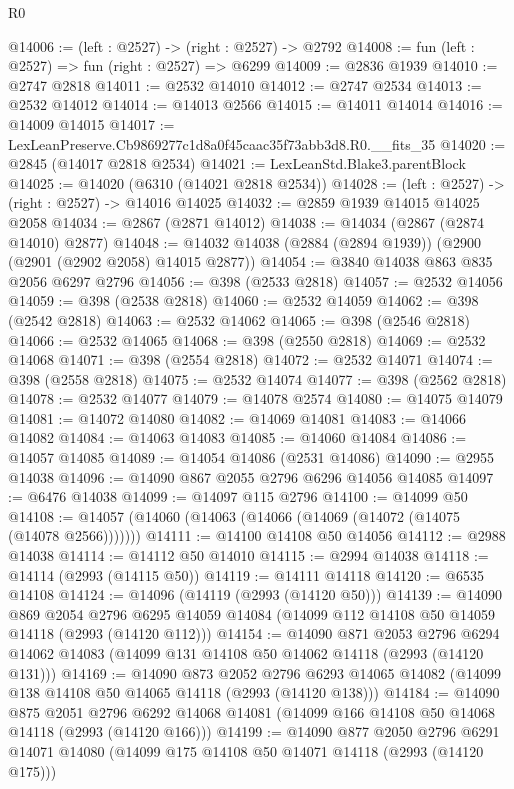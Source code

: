 \begin{lexlean}{R0}
\begin{coremodule}
@14006 := (left : @2527) -> (right : @2527) -> @2792
@14008 := fun (left : @2527) => fun (right : @2527) => @6299
@14009 := @2836 @1939
@14010 := @2747 @2818
@14011 := @2532 @14010
@14012 := @2747 @2534
@14013 := @2532 @14012
@14014 := @14013 @2566
@14015 := @14011 @14014
@14016 := @14009 @14015
@14017 := LexLeanPreserve.Cb9869277c1d8a0f45caac35f73abb3d8.R0.__fits_35
@14020 := @2845 (@14017 @2818 @2534)
@14021 := LexLeanStd.Blake3.parentBlock
@14025 := @14020 (@6310 (@14021 @2818 @2534))
@14028 := (left : @2527) -> (right : @2527) -> @14016 @14025
@14032 := @2859 @1939 @14015 @14025 @2058
@14034 := @2867 (@2871 @14012)
@14038 := @14034 (@2867 (@2874 @14010) @2877)
@14048 := @14032 @14038 (@2884 (@2894 @1939)) (@2900 (@2901 (@2902 @2058) @14015 @2877))
@14054 := @3840 @14038 @863 @835 @2056 @6297 @2796
@14056 := @398 (@2533 @2818)
@14057 := @2532 @14056
@14059 := @398 (@2538 @2818)
@14060 := @2532 @14059
@14062 := @398 (@2542 @2818)
@14063 := @2532 @14062
@14065 := @398 (@2546 @2818)
@14066 := @2532 @14065
@14068 := @398 (@2550 @2818)
@14069 := @2532 @14068
@14071 := @398 (@2554 @2818)
@14072 := @2532 @14071
@14074 := @398 (@2558 @2818)
@14075 := @2532 @14074
@14077 := @398 (@2562 @2818)
@14078 := @2532 @14077
@14079 := @14078 @2574
@14080 := @14075 @14079
@14081 := @14072 @14080
@14082 := @14069 @14081
@14083 := @14066 @14082
@14084 := @14063 @14083
@14085 := @14060 @14084
@14086 := @14057 @14085
@14089 := @14054 @14086 (@2531 @14086)
@14090 := @2955 @14038
@14096 := @14090 @867 @2055 @2796 @6296 @14056 @14085
@14097 := @6476 @14038
@14099 := @14097 @115 @2796
@14100 := @14099 @50
@14108 := @14057 (@14060 (@14063 (@14066 (@14069 (@14072 (@14075 (@14078 @2566)))))))
@14111 := @14100 @14108 @50 @14056
@14112 := @2988 @14038
@14114 := @14112 @50 @14010
@14115 := @2994 @14038
@14118 := @14114 (@2993 (@14115 @50))
@14119 := @14111 @14118
@14120 := @6535 @14108
@14124 := @14096 (@14119 (@2993 (@14120 @50)))
@14139 := @14090
    @869
    @2054
    @2796
    @6295
    @14059
    @14084
    (@14099 @112 @14108 @50 @14059 @14118 (@2993 (@14120 @112)))
@14154 := @14090
    @871
    @2053
    @2796
    @6294
    @14062
    @14083
    (@14099 @131 @14108 @50 @14062 @14118 (@2993 (@14120 @131)))
@14169 := @14090
    @873
    @2052
    @2796
    @6293
    @14065
    @14082
    (@14099 @138 @14108 @50 @14065 @14118 (@2993 (@14120 @138)))
@14184 := @14090
    @875
    @2051
    @2796
    @6292
    @14068
    @14081
    (@14099 @166 @14108 @50 @14068 @14118 (@2993 (@14120 @166)))
@14199 := @14090
    @877
    @2050
    @2796
    @6291
    @14071
    @14080
    (@14099 @175 @14108 @50 @14071 @14118 (@2993 (@14120 @175)))

\end{coremodule}
\end{lexlean}
